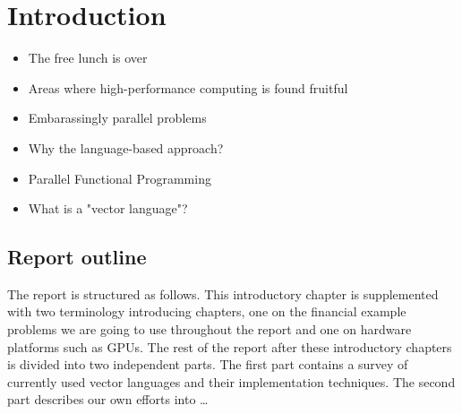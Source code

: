 \chapter{Introduction}
\begin{itemize}
\item The free lunch is over
\item Areas where high-performance computing is found fruitful
\item Embarassingly parallel problems
\item Why the language-based approach?
\item Parallel Functional Programming
\item What is a "vector language"?
\end{itemize}

\section{Report outline}
The report is structured as follows. This introductory chapter is
supplemented with two terminology introducing chapters, one on the
financial example problems we are going to use throughout the report
and one on hardware platforms such as GPUs. The rest of the report
after these introductory chapters is divided into two independent
parts. The first part contains a survey of currently used vector
languages and their implementation techniques. The second part
describes our own efforts into \ldots

